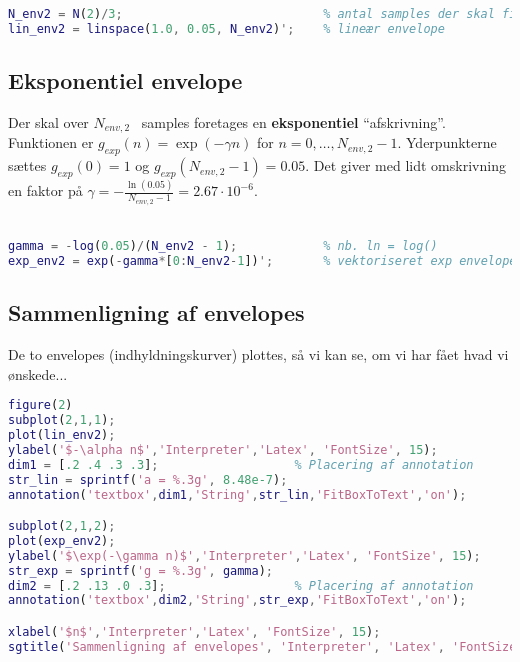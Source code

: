 \documentclass[a4paper]{report}
\begin{document}
\begin{lstlisting}[language=Matlab, style=Matlab-editor]
N_env2 = N(2)/3;                            % antal samples der skal filtr.
lin_env2 = linspace(1.0, 0.05, N_env2)';    % lineær envelope
\end{lstlisting}
\begin{par}
\subsection{Eksponentiel envelope}
\end{par} 
\begin{par}

Der skal over $N_{env,2}$~ samples foretages en \textbf{eksponentiel} ``afskrivning''.
Funktionen er $g_{exp}(n) = \exp(-\gamma n)$ for $n=0,\ldots,N_{env,2}-1$.
Yderpunkterne sættes $g_{exp}(0) = 1$ og $g_{exp}(N_{env,2}-1) = 0.05$.
Det giver med lidt omskrivning en faktor på $ \gamma = -\frac{\ln(0.05)}{N_{env,2}-1}=2.67\cdot 10^{-6}$.\\\\

\end{par} 

\begin{lstlisting}[language=Matlab, style=Matlab-editor]
gamma = -log(0.05)/(N_env2 - 1);            % nb. ln = log()
exp_env2 = exp(-gamma*[0:N_env2-1])';       % vektoriseret exp envelope
\end{lstlisting}
\begin{par}
\subsection{Sammenligning af envelopes}
\end{par} 
\begin{par}

De to envelopes (indhyldningskurver) plottes, så vi kan se, om vi har
fået hvad vi ønskede...\\

\end{par} 

\begin{lstlisting}[language=Matlab, style=Matlab-editor]
figure(2)
subplot(2,1,1);
plot(lin_env2);
ylabel('$-\alpha n$','Interpreter','Latex', 'FontSize', 15);
dim1 = [.2 .4 .3 .3];                   % Placering af annotation
str_lin = sprintf('a = %.3g', 8.48e-7);
annotation('textbox',dim1,'String',str_lin,'FitBoxToText','on');

subplot(2,1,2);
plot(exp_env2);
ylabel('$\exp(-\gamma n)$','Interpreter','Latex', 'FontSize', 15);
str_exp = sprintf('g = %.3g', gamma);
dim2 = [.2 .13 .0 .3];                  % Placering af annotation
annotation('textbox',dim2,'String',str_exp,'FitBoxToText','on');

xlabel('$n$','Interpreter','Latex', 'FontSize', 15);
sgtitle('Sammenligning af envelopes', 'Interpreter', 'Latex', 'FontSize', 20);
\end{lstlisting}
\end{document}

